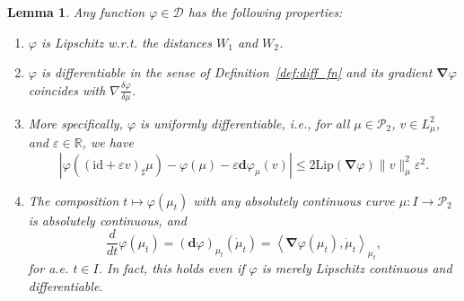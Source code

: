 \documentclass[sn-mathphys-num]{sn-jnl}
\numberwithin{equation}{section}
\theoremstyle{mythm}
\newtheorem{lemma}[proposition]{Lemma}
\theoremstyle{mydef}
\newcommand{\Lip}{\mathrm{Lip}}
\renewcommand{\phi}{\varphi}
\newcommand{\id}{\mathrm{id}}
\renewcommand{\mathbf}[1]{\bm{#1}}
\begin{document}
\begin{lemma}
  \label{lem:testlip}
  Any function \( \phi \in  \bm{\mathcal D}\) has the following properties:
  \begin{enumerate}[{\rm (1)}]
    \item \( \phi \) is Lipschitz w.r.t. the distances \( W_1 \) and \( W_2 \).
    \item \( \phi \) is differentiable in the sense of Definition~\ref{def:diff_fn} and its gradient \( \bm \nabla \phi \) coincides with \( \nabla\frac{\delta \phi}{\delta \mu}  \).
    \item More specifically, \( \phi \) is uniformly differentiable, i.e.,   for all \( \mu\in \mathcal{P}_2 \), \( v \in {L}^2_{\mu} \), and \( \varepsilon\in \mathbb{R} \), we have
    \begin{displaymath}
    \left|\phi \left((\id+\varepsilon v)_{\sharp}\mu  \right) - \phi(\mu) - \varepsilon \mathbf{d}\phi_{\mu}(v)\right| \le 2\Lip(\bm\nabla \phi)\|v\|^2_{\mu} \varepsilon^2.
  \end{displaymath}
    \item The composition \( t\mapsto \phi(\mu_t) \) with any absolutely continuous curve \( \mu\colon I\to \mathcal{P}_2 \) is absolutely continuous, and
\begin{equation}
    \frac{d}{dt} \phi(\mu_t) = (\mathbf{d}\phi)_{\mu_t}(\dot \mu_t) = \left< \bm \nabla \phi(\mu_t), \dot \mu_t \right>_{\mu_t},\label{form-diff}
\end{equation}
for a.e. \( t\in I \). In fact, this holds even if \( \phi \) is merely Lipschitz continuous and differentiable.
  \end{enumerate}
\end{lemma}
\end{document}
